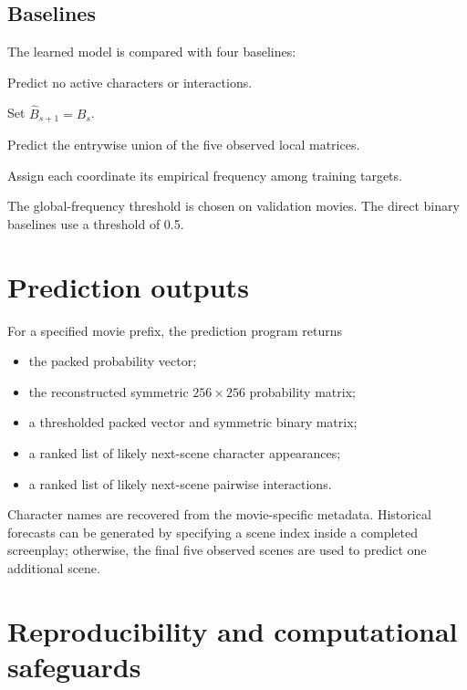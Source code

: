 \documentclass[11pt]{article}
\begin{document}
\subsection{Baselines}

The learned model is compared with four baselines:

\begin{description}[leftmargin=2.8cm,style=nextline]
  \item[All zero] Predict no active characters or interactions.
  \item[Repeat last] Set $\widehat{B}_{s+1}=B_s$.
  \item[Recent union] Predict the entrywise union of the five observed local matrices.
  \item[Global frequency] Assign each coordinate its empirical frequency among training targets.
\end{description}

The global-frequency threshold is chosen on validation movies. The direct binary baselines use a threshold of 0.5.

\section{Prediction outputs}

For a specified movie prefix, the prediction program returns

\begin{itemize}[leftmargin=2em]
  \item the packed probability vector;
  \item the reconstructed symmetric $256\times256$ probability matrix;
  \item a thresholded packed vector and symmetric binary matrix;
  \item a ranked list of likely next-scene character appearances;
  \item a ranked list of likely next-scene pairwise interactions.
\end{itemize}

Character names are recovered from the movie-specific metadata. Historical forecasts can be generated by specifying a scene index inside a completed screenplay; otherwise, the final five observed scenes are used to predict one additional scene.

\section{Reproducibility and computational safeguards}
\end{document}
